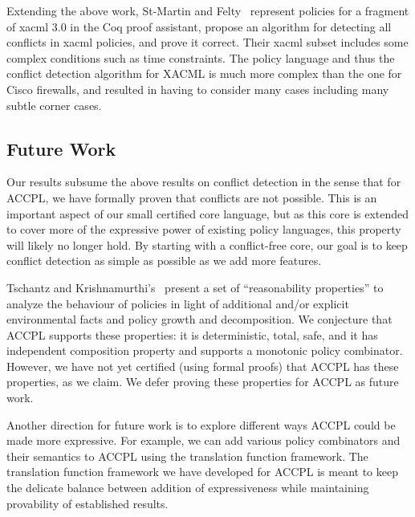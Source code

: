 \documentclass[runningheads,a4paper]{llncs}
\begin{document}
Extending the above work, St-Martin and Felty~\cite{felty16} represent
policies for a fragment of \ac{xacml} 3.0 in the Coq proof assistant,
propose an algorithm for detecting all conflicts in \ac{xacml}
policies, and prove it correct. Their \ac{xacml} subset includes some
complex conditions such as time constraints. The policy language and
thus the conflict detection algorithm for XACML is much more complex
than the one for Cisco firewalls, and resulted in having to consider
many cases including many subtle corner cases.

\subsection{Future Work}


Our results subsume the above results on conflict detection in the
sense that for \ac{ACCPL}, we have formally proven that conflicts are
not possible.  This is an important aspect of our small certified core
language, but as this core is extended to cover more of the expressive
power of existing policy languages, this property will likely no
longer hold.  By starting with a conflict-free core, our goal is to
keep conflict detection as simple as possible as we add more features.

Tschantz and Krishnamurthi's~\cite{Tschantz} present a set of ``reasonability properties'' to analyze the behaviour of policies in light of additional and/or explicit environmental facts and policy growth and decomposition. We conjecture that \ac{ACCPL} supports these properties: it is deterministic, total, safe, and it has independent composition property and supports a monotonic policy combinator. However, we have not yet certified (using formal proofs) that \ac{ACCPL} has these properties, as we claim. We defer proving these properties for \ac{ACCPL} as future work. 

Another direction for future work is to explore different ways \ac{ACCPL} could be made more expressive. For example, we can add various policy combinators and their semantics to \ac{ACCPL} using the translation function framework. The translation function framework we have developed for \ac{ACCPL} is meant to keep the delicate balance between addition of expressiveness while maintaining provability of established results.
\end{document}
